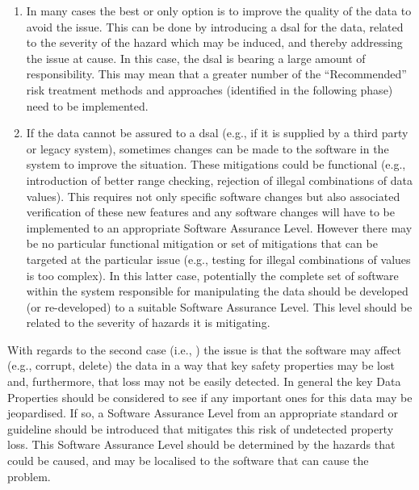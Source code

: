 \begin{enumerate}
  \item {} In many cases the best or only option is to improve the quality of the data to avoid the issue. This can be done by introducing a \gls{dsal} for the data, related to the severity of the hazard which may be induced, and thereby addressing the issue at cause. In this case, the \gls{dsal} is bearing a large amount of responsibility. This may mean that a greater number of the ``Recommended'' risk treatment methods and approaches (identified in the following phase) need to be implemented.
  \item {} If the data cannot be assured to a \gls{dsal} (e.g., if it is supplied by a third party or legacy system), sometimes changes can be made to the software in the system to improve the situation. These mitigations could be functional (e.g., introduction of better range checking, rejection of illegal combinations of data values). This requires not only specific software changes but also associated verification of these new features and any software changes will have to be implemented to an appropriate Software Assurance Level. However there may be no particular functional mitigation or set of mitigations that can be targeted at the particular issue (e.g., testing for illegal combinations of values is too complex). In this latter case, potentially the complete set of software within the system responsible for manipulating the data should be developed (or re-developed) to a suitable Software Assurance Level. This level should be related to the severity of hazards it is mitigating.
\end{enumerate}

With regards to the second case (i.e., ) the issue is that the software may affect (e.g., corrupt, delete) the data in a way that key safety properties may be lost and, furthermore, that loss may not be easily detected. In general the key Data Properties should be considered to see if any important ones for this data may be jeopardised. If so, a Software Assurance Level from an appropriate standard or guideline should be introduced that mitigates this risk of undetected property loss. This Software Assurance Level should be determined by the hazards that could be caused, and may be localised to the software that can cause the problem.

